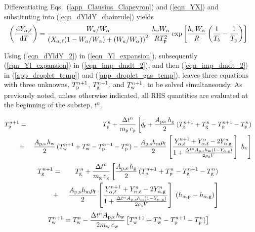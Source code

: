 Differentiating Eqs.~(\ref{app_Clausius_Clapeyron}) and (\ref{eqn_YX}) and substituting into (\ref{eqn_dYldY_chainrule}) yields
\begin{equation}
\label{eqn_dYldY_2}
\left(\frac{\,\mathrm{d} Y_{\alpha,\ell}}{\,\mathrm{d} T}\right)=\frac{W_a / W_{\alpha}} {\left( X_{\alpha,\ell}(1-W_a/W_{\alpha})+(W_a/W_{\alpha}) \right)^2} \;\frac{h_v W_{\alpha}} {R T^2_{\rm p}} \exp\left[ \frac{h_v W_{\alpha}} {R} \left(\frac{1}{T_b} - \frac{1}{T_{\rm p}}\right)\right]
\end{equation}

Using (\ref{eqn_dYldY_2}) in (\ref{eqn_Yl_expansion}), subsequently (\ref{eqn_Yl_expansion}) in (\ref{eqn_imp_dmdt_2}), and then (\ref{eqn_imp_dmdt_2}) in (\ref{app_droplet_temp}) and (\ref{app_droplet_gas_temp}), leaves three equations with three unknowns, $T^{n+1}_{\rm p}$, $T^{n+1}_{\rm g}$,  and $T^{n+1}_{\rm w}$, to be solved simultaneously. As previously noted, unless otherwise indicated, all RHS quantities are evaluated at the beginning of the substep, $t^n$.

\begin{eqnarray}
\nonumber T_{\rm p}^{n+1} &=& T_{\rm p}^n + \frac{\Delta t^n}{m_{\rm p} \, c_{\rm p}}  \left[ \dot{q}_{\rm r} + \frac{ A_{\rm p,s} \, h_{\rm g}}{2}  \, (T_{\rm g}^{n+1}+T_{\rm g}^n-T_{\rm p}^{n+1}-T_{\rm p}^n) \right. \\
&+& \left. \frac{A_{\rm p,s} \, h_{\rm w}}{2}  \, (T_{\rm w}^{n+1}+T_{\rm w}^n-T_{\rm p}^{n+1}-T_{\rm p}^n) -\frac{A_{\rm p,s} h_{\rm m} \rho_{\rm f}}{2} \left[\frac{Y^{n+1}_{\alpha,\ell}+Y^n_{\alpha,\ell}-2Y^n_{\rm \alpha, g}}{1+\frac{\Delta t^n A_{\rm p,s} h_{\rm m}(1-Y_{\rm \alpha, g})}{2 \rho_{\rm g} V}}\right] \; h_{\rm v} \right]
\label{eqn_imp_dTpdtx_2}
\end{eqnarray}
\begin{eqnarray}
\nonumber T_{\rm g}^{n+1} &=& T_{\rm g}^n + \frac{\Delta t^n}{m_{\rm g} \, c_{\rm g}} \left[ \frac{A_{\rm p,s} \, h_{\rm g}}{2}  \, (T_{\rm p}^{n+1}+T_{\rm p}^n-T_{\rm g}^{n+1}-T_{\rm g}^n) \right. \\
&+& \left. \frac{A_{\rm p,s} h_{\rm m} \rho_{\rm f}}{2} \left[\frac{Y^{n+1}_{\alpha,\ell}+Y^n_{\alpha,\ell}-2Y^n_{\rm \alpha, g}}{1+\frac{\Delta t^n A_{\rm p,s} h_{\rm m}(1-Y_{\rm \alpha, g})}{2 \rho_{\rm g} V}}\right] \; (h_{\rm \alpha,p}-h_{\rm \alpha,g}) \right]
\label{eqn_imp_dTgdTx_2}
\end{eqnarray}
\begin{equation}
T_{\rm w}^{n+1} = T_{\rm w}^n-\frac{\Delta t^n A_{\rm p,s} \, h_{\rm w}}{2 m_{\rm w} \, c_{\rm w}} \left[ T_{\rm w}^{n+1}+T_{\rm w}^n-T_{\rm p}^{n+1}-T_{\rm p}^n) \right]
\label{eqn_imp_dTwdTx_2}
\end{equation}

